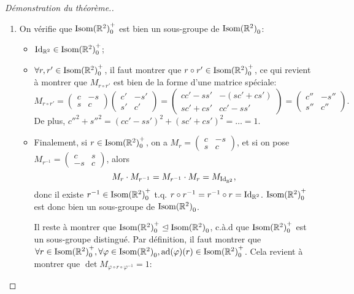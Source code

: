 \documentclass{book}
\numberwithin{equation}{section}
\renewcommand{\phi}{\varphi}
\providecommand{\plan}{{\mathbb R^2}}
\providecommand{\id}{{\textnormal{Id}}}
\providecommand{\idR}{{\id_\plan}}
\providecommand{\isom}{{\textnormal{Isom}(\plan)}}
\providecommand{\isomo}{{\isom_0}}
\providecommand{\isomop}{\isom_0^+}
\providecommand{\ad}{{\textnormal{ad}}}
\providecommand{\subgroupnormaleq}{\trianglelefteq}
\begin{document}
\begin{proof}[Démonstration du théorème.]
	\begin{enumerate}
		\item On vérifie que $\isomop$ est bien un sous-groupe de $\isomo$:
		\begin{itemize}
			\item $\idR \in \isomop$;
			\item $\forall r, r' \in \isomop$, il faut montrer que $r \circ r' \in \isomop$, ce qui revient à montrer que $M_{r \circ r'}$ est bien de la forme d'une matrice spéciale:
			\begin{equation*}
				M_{r \circ r'} = \begin{pmatrix}
					c & -s \\
					s & c
				\end{pmatrix} \begin{pmatrix}
					c' & -s' \\
					s' & c'
				\end{pmatrix} = \begin{pmatrix}
					cc'-ss' & -(sc' + cs') \\
					sc' + cs' & cc' - ss'
				\end{pmatrix} = \begin{pmatrix}
					c'' & -s'' \\
					s'' & c''
				\end{pmatrix}.
			\end{equation*}
			De plus, $c''^2 + s''^2 = (cc' - ss')^2 + (sc' + cs')^2 = \ldots = 1$.
			\item Finalement, si $r \in \isomop$, on a $M_r = \left(\begin{smallmatrix} c&-s \\ s&c \end{smallmatrix}\right)$, et si on pose $M_{r^{-1}} = \left(\begin{smallmatrix} c & s \\ -s & c \end{smallmatrix}\right)$, alors
			\begin{equation*}
				M_r \cdot M_{r^{-1}} = M_{r^{-1}} \cdot M_r = M_\idR,
			\end{equation*}
			donc il existe $r^{-1} \in \isomop$ t.q. $r \circ r^{-1} = r^{-1} \circ r = \idR$.
			$\isomop$ est donc bien un sous-groupe de $\isomo$. \par
			Il reste à montrer que $\isomop \subgroupnormaleq \isomo$, c.à.d que $\isomop$ est un sous-groupe distingué. Par définition, il faut montrer que $\forall r \in \isomop, \forall \phi \in \isomo, \ad(\phi)(r) \in \isomop$. Cela revient à montrer que $\det M_{\phi \circ r \circ \phi^{-1}} = 1$:

\end{itemize}
\end{enumerate}
\end{proof}
\end{document}
